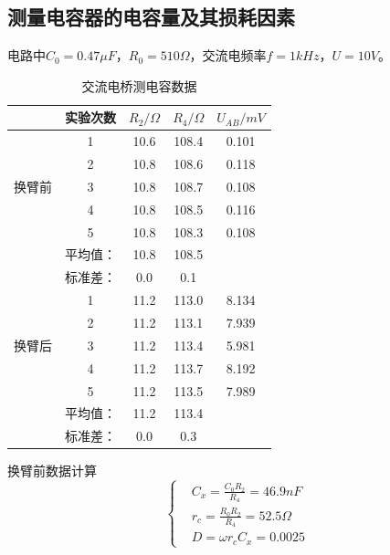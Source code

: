 \documentclass[10pt,a4paper,twocolumn,twoside,UTF8]{ctexart}
\begin{document}
\subsection{测量电容器的电容量及其损耗因素}
电路中$C_0=0.47\mu F$，$R_0=510\Omega$，交流电频率$f=1kHz$，$U=10V$。
\begin{table}[!h]
	\centering
	  \begin{tabular}{c|cccc}
	  \toprule
	  \multicolumn{1}{c}{} & 实验次数  & $R_2/\Omega $   & $R_4/\Omega$   & $U_{AB}/mV$  \\
	  \midrule
	  \multicolumn{1}{c}{\multirow{5}[2]{*}{换臂前}} & 1     & 10.6 & 108.4  & 0.101  \\
	  \multicolumn{1}{c}{} & 2     & 10.8 & 108.6  & 0.118 \\
	  \multicolumn{1}{c}{} & 3     & 10.8 & 108.7  & 0.108 \\
	  \multicolumn{1}{c}{} & 4     & 10.8 & 108.5  & 0.116  \\
	  \multicolumn{1}{c}{} & 5     & 10.8 & 108.3  & 0.108  \\
	  \midrule
	  \multicolumn{1}{c}{}  & 平均值：  & 10.8 & 108.5 & \\
	  \multicolumn{1}{c}{}& 标准差：  & 0.0 & 0.1 &  \\
	  \midrule
	  \multicolumn{1}{c}{\multirow{5}[2]{*}{换臂后}} & 1     & 11.2 & 113.0  & 8.134\\
	  \multicolumn{1}{c}{} & 2     & 11.2 & 113.1  & 7.939 \\
	  \multicolumn{1}{c}{} & 3     & 11.2 & 113.4 & 5.981 \\
	  \multicolumn{1}{c}{} & 4     & 11.2 & 113.7 & 8.192\\
	  \multicolumn{1}{c}{} & 5     & 11.2 & 113.5 & 7.989 \\
	  \midrule
	  \multicolumn{1}{c}{}& 平均值：  & 11.2 & 113.4 &  \\
	  \multicolumn{1}{c}{}& 标准差：  & 0.0 & 0.3 &  \\
	  \bottomrule
	  \end{tabular}%
   \caption{交流电桥测电容数据}	  
   \label{tab:1}
  \end{table}%

  换臂前数据计算
  \[\left\{%
  \begin{aligned}
  &C_x=\frac{C_0 R_2}{R_4}=46.9 nF\\
  &r_c=\frac{R_0 R_2}{R_4}=52.5\Omega\\
  &D=\omega r_c C_x=0.0025
  \end{aligned}
 \right.
\]
\end{document}
